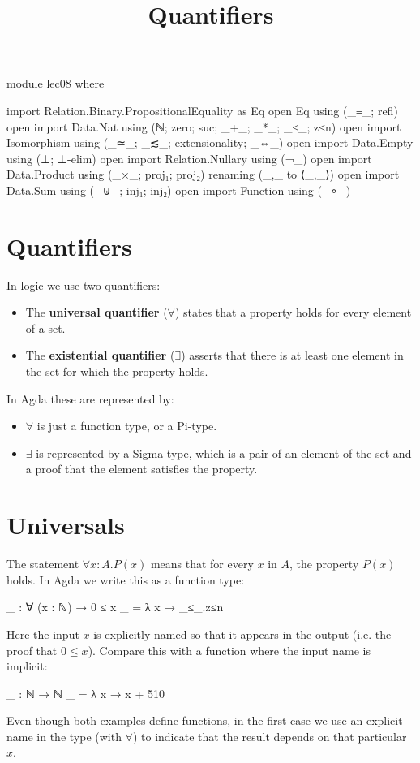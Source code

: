 \documentclass{lecturenotes}
\title{Quantifiers}
\begin{document}
\maketitle

\begin{code}
module lec08 where

import Relation.Binary.PropositionalEquality as Eq
open Eq using (_≡_; refl)
open import Data.Nat using (ℕ; zero; suc; _+_; _*_; _≤_; z≤n)
open import Isomorphism using (_≃_; _≲_; extensionality; _⇔_)
open import Data.Empty using (⊥; ⊥-elim)
open import Relation.Nullary using (¬_)
open import Data.Product using (_×_; proj₁; proj₂) renaming (_,_ to ⟨_,_⟩)
open import Data.Sum using (_⊎_; inj₁; inj₂)
open import Function using (_∘_)
\end{code}

\section{Quantifiers}
\label{sec:quantifiers}

In logic we use two quantifiers:
\begin{itemize}
  \item The \textbf{universal quantifier} ($\forall$) states that a property holds for every element of a set.
  \item The \textbf{existential quantifier} ($\exists$) asserts that there is at least one element in the set for which the property holds.
\end{itemize}
In Agda these are represented by:
\begin{itemize}
  \item $\forall$ is just a function type, or a Pi-type.
  \item $\exists$ is represented by a Sigma-type, which is a pair of an element of the set and a proof that the element satisfies the property.
\end{itemize}

\section{Universals}
\label{sec:universals}

The statement $\forall x : A.P(x)$ means that for every $x$ in $A$, the property $P(x)$ holds. In Agda we write this as a function type:
\begin{code}
_ : ∀ (x : ℕ) → 0 ≤ x
_ = λ x → _≤_.z≤n
\end{code}
Here the input $x$ is explicitly named so that it appears in the output (i.e. the proof that $0 ≤ x$). Compare this with a function where the input name is implicit:
\begin{code}
_ : ℕ → ℕ
_ = λ x → x + 510
\end{code}
Even though both examples define functions, in the first case we use an explicit name in the type (with $\forall$) to indicate that the result depends on that particular $x$.
\end{document}
